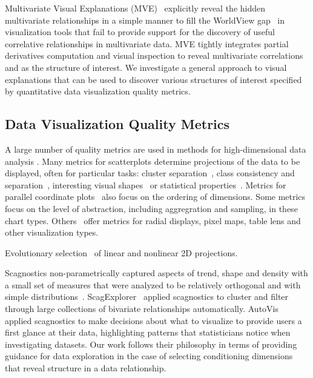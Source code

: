 Multivariate Visual Explanations (MVE)~\cite{Barlowe2008} explicitly reveal the hidden multivariate relationships in a simple manner to fill the WorldView gap~\cite{Amar2004} in visualization tools that fail to provide support for the discovery of useful correlative relationships in multivariate data. MVE tightly integrates partial derivatives computation and visual inspection to reveal multivariate correlations and as the structure of interest. We investigate a general approach to visual explanations that can be used to discover various structures of interest specified by quantitative data visualization quality metrics.

\subsection{Data Visualization Quality Metrics}
A large number of quality metrics are used in methods for high-dimensional data analysis \cite{Bertini2011}.  Many metrics for scatterplots determine projections of the data to be displayed, often for particular tasks: cluster separation~\cite{Sedlmair2012, Tatu2009}, class consistency and separation~\cite{Sips2009, Schafer2013}, interesting visual shapes~\cite{Wilkinson2005} or statistical properties~\cite{Kandel2012, Seo2005, Piringer2008}. Metrics for parallel coordinate plots~\cite{Ankerst1998, Dasgupta2010, Johansson2009, Yang2003} also focus on the ordering of dimensions. Some metrics~\cite{Bertini2006, Cui2006} focus on the level of abstraction, including aggregration and sampling, in these chart types. Others~\cite{Albuquerque2010, Ankerst1998, Schneidewind2006, Yang2003} offer metrics for radial displays, pixel maps, table lens and other visualization types. 

Evolutionary selection~\cite{Boukhelifa2013} of linear and nonlinear 2D projections.

Scagnostics non-parametrically captured aspects of trend, shape and density with a small set of measures that were analyzed to be relatively orthogonal and with simple distributions~\cite{Wilkinson2008}. ScagExplorer~\cite{Dang2014} applied scagnostics to cluster and filter through large collections of bivariate relationships automatically. AutoVis~\cite{Wills2010} applied scagnostics to make decisions about what to visualize to provide users a first glance at their data, highlighting patterns that statisticians notice when investigating datasets. Our work follows their philosophy in terms of providing guidance for data exploration in the case of selecting conditioning dimensions that reveal structure in a data relationship. 

